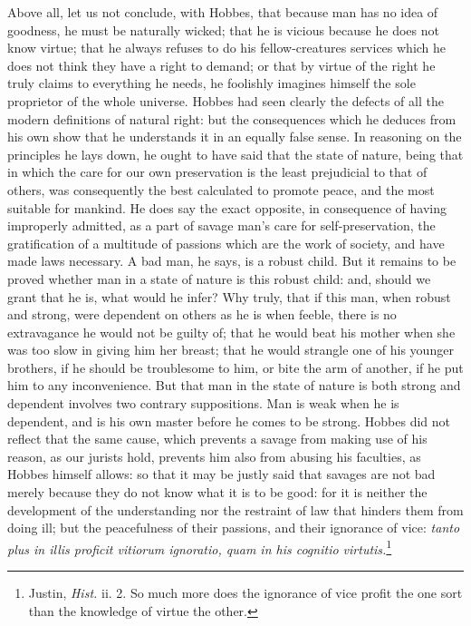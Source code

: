 \documentclass[12pt]{report}
\begin{document}
Above all, let us not conclude, with Hobbes, that because man has no idea of goodness, he must be naturally wicked; that he is vicious because he does not know virtue; that he always refuses to do his fellow-creatures services which he does not think they have a right to demand; or that by virtue of the right he truly claims to everything he needs, he foolishly imagines himself the sole proprietor of the whole universe. Hobbes had seen clearly the defects of all the modern definitions of natural right: but the consequences which he deduces from his own show that he understands it in an equally false sense. In reasoning on the principles he lays down, he ought to have said that the state of nature, being that in which the care for our own preservation is the least prejudicial to that of others, was consequently the best calculated to promote peace, and the most suitable for mankind. He does say the exact opposite, in consequence of having improperly admitted, as a part of savage man's care for self-preservation, the gratification of a multitude of passions which are the work of society, and have made laws necessary. A bad man, he says, is a robust child. But it remains to be proved whether man in a state of nature is this robust child: and, should we grant that he is, what would he infer? Why truly, that if this man, when robust and strong, were dependent on others as he is when feeble, there is no extravagance he would not be guilty of; that he would beat his mother when she was too slow in giving him her breast; that he would strangle one of his younger brothers, if he should be troublesome to him, or bite the arm of another, if he put him to any inconvenience. But that man in the state of nature is both strong and dependent involves two contrary suppositions. Man is weak when he is dependent, and is his own master before he comes to be strong. Hobbes did not reflect that the same cause, which prevents a savage from making use of his reason, as our jurists hold, prevents him also from abusing his faculties, as Hobbes himself allows: so that it may be justly said that savages are not bad merely because they do not know what it is to be good: for it is neither the development of the understanding nor the restraint of law that hinders them from doing ill; but the peacefulness of their passions, and their ignorance of vice: \emph{tanto plus in illis proficit vitiorum ignoratio, quam in his cognitio virtutis.}\footnote{Justin, \textit{Hist.} ii. 2. So much more does the ignorance of vice profit the one sort than the knowledge of virtue the other.}
\end{document}
